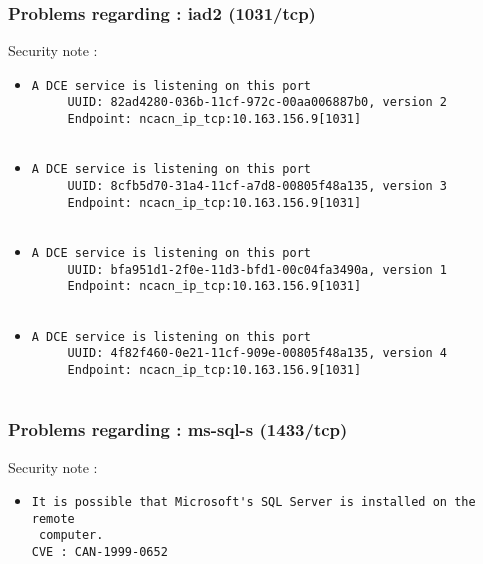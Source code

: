 \documentclass{article}
\begin{document}
\subsubsection{Problems regarding : iad2 (1031/tcp)}
Security note :\\
\begin{itemize}
\item \begin{verbatim}
A DCE service is listening on this port
     UUID: 82ad4280-036b-11cf-972c-00aa006887b0, version 2
     Endpoint: ncacn_ip_tcp:10.163.156.9[1031]


\end{verbatim}\item \begin{verbatim}
A DCE service is listening on this port
     UUID: 8cfb5d70-31a4-11cf-a7d8-00805f48a135, version 3
     Endpoint: ncacn_ip_tcp:10.163.156.9[1031]


\end{verbatim}\item \begin{verbatim}
A DCE service is listening on this port
     UUID: bfa951d1-2f0e-11d3-bfd1-00c04fa3490a, version 1
     Endpoint: ncacn_ip_tcp:10.163.156.9[1031]


\end{verbatim}\item \begin{verbatim}
A DCE service is listening on this port
     UUID: 4f82f460-0e21-11cf-909e-00805f48a135, version 4
     Endpoint: ncacn_ip_tcp:10.163.156.9[1031]


\end{verbatim}\end{itemize}
\subsubsection{Problems regarding : ms-sql-s (1433/tcp)}
Security note :\\
\begin{itemize}
\item \begin{verbatim}
It is possible that Microsoft's SQL Server is installed on the remote
 computer.
CVE : CAN-1999-0652
\end{verbatim}\end{itemize}
\end{document}
